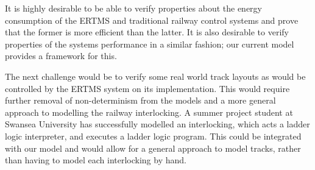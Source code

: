 It is highly desirable to be able to verify properties about the energy consumption of the ERTMS and traditional railway control systems and prove that the former is more efficient than the latter. It is also desirable to verify properties of the systems performance in a similar fashion; our current model provides a framework for this.

The next challenge would be to verify  some real world track layouts as would be controlled by the ERTMS system on its implementation. This would require further removal of non-determinism from the models and a more general approach to modelling the railway interlocking. A summer project student at Swansea University has successfully modelled an interlocking, which acts a ladder logic interpreter, and executes a ladder logic program. This could be integrated with our model and would allow for a general approach to model tracks, rather than having to model each interlocking by hand.

